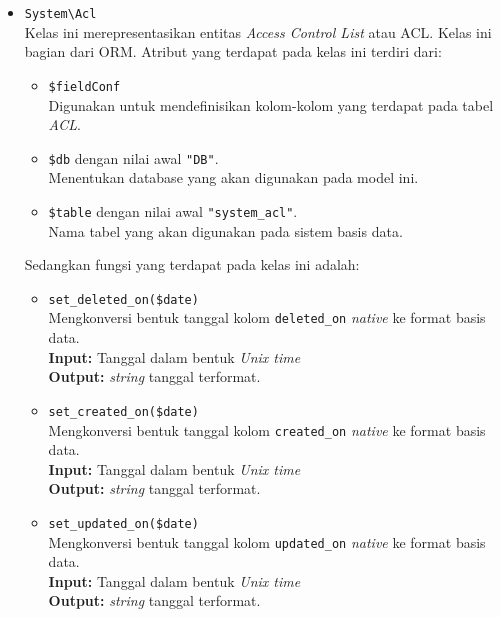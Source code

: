 \begin{itemize}
        \item \texttt{System\textbackslash Acl} \\
            Kelas ini merepresentasikan entitas \textit{Access Control List}
            atau ACL. Kelas ini bagian dari ORM. Atribut yang terdapat pada
            kelas ini terdiri dari:
            \begin{itemize}
                \item \texttt{\$fieldConf} \\
                    Digunakan untuk mendefinisikan kolom-kolom yang terdapat
                    pada tabel \textit{ACL}.
                \item \texttt{\$db} dengan nilai awal \texttt{"DB"}. \\
                    Menentukan database yang akan digunakan pada model ini.
                \item \texttt{\$table} dengan nilai awal \texttt{"system\_acl"}.
                \\
                    Nama tabel yang akan digunakan pada sistem basis data. 
            \end{itemize}
            Sedangkan fungsi yang terdapat pada kelas ini adalah:
            \begin{itemize}
                \item \texttt{set\_deleted\_on(\$date)}\\
                    Mengkonversi bentuk tanggal kolom \texttt{deleted\_on}
                    \textit{native} ke format basis data. \\
                    \textbf{Input:} Tanggal dalam bentuk \textit{Unix time}\\
                    \textbf{Output:} \textit{string} tanggal terformat.
                
                \item \texttt{set\_created\_on(\$date)} \\
                    Mengkonversi bentuk tanggal kolom \texttt{created\_on}
                    \textit{native} ke format basis data. \\
                    \textbf{Input:} Tanggal dalam bentuk \textit{Unix time}\\
                    \textbf{Output:} \textit{string} tanggal terformat.
                
                \item \texttt{set\_updated\_on(\$date)} \\
                    Mengkonversi bentuk tanggal kolom \texttt{updated\_on}
                    \textit{native} ke format basis data. \\
                    \textbf{Input:} Tanggal dalam bentuk \textit{Unix time}\\
                    \textbf{Output:} \textit{string} tanggal terformat.
                

\end{itemize}
\end{itemize}
